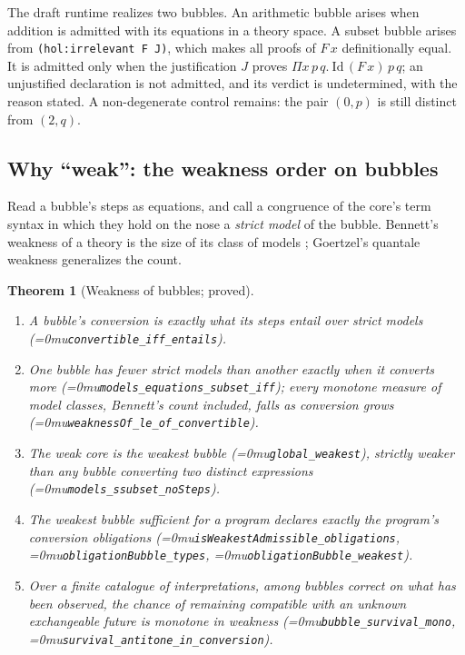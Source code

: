 \documentclass[11pt]{article}
\newcommand{\leanname}[1]{\textup{\Urlmuskip=0mu\relax\nolinkurl{#1}}}
\newtheorem{theorem}{Theorem}
\theoremstyle{definition}
\theoremstyle{remark}
\newcommand{\code}[1]{\texttt{#1}}
\begin{document}
The draft runtime realizes two bubbles. An arithmetic bubble arises when
addition is admitted with its equations in a theory space. A subset bubble
arises from \code{(hol:irrelevant F J)}, which makes all proofs of $F\,x$
definitionally equal. It is admitted only when the justification $J$ proves
$\Pi x\,p\,q.\ \mathrm{Id}\,(F\,x)\,p\,q$; an unjustified declaration is not
admitted, and its verdict is undetermined, with the reason stated. A non-degenerate control remains: the
pair $(0, p)$ is still distinct from $(2, q)$.

\subsection{Why ``weak'': the weakness order on bubbles}

Read a bubble's steps as equations, and call a congruence of the core's term
syntax in which they hold on the nose a \emph{strict model} of the bubble.
Bennett's weakness of a theory is the size of its class of models
\cite{BennettWeakestNotShortest}; Goertzel's quantale weakness generalizes the
count.

\begin{theorem}[Weakness of bubbles; proved]
\leavevmode
\begin{enumerate}[leftmargin=*]
\item A bubble's conversion is exactly what its steps entail over strict models
  (\leanname{convertible_iff_entails}).
\item One bubble has fewer strict models than another exactly when it converts
  more (\leanname{models_equations_subset_iff}); every monotone measure of
  model classes, Bennett's count included, falls as conversion grows
  (\leanname{weaknessOf_le_of_convertible}).
\item The weak core is the weakest bubble (\leanname{global_weakest}), strictly
  weaker than any bubble converting two distinct expressions
  (\leanname{models_ssubset_noSteps}).
\item The weakest bubble sufficient for a program declares exactly the
  program's conversion obligations (\leanname{isWeakestAdmissible_obligations},
  \leanname{obligationBubble_types}, \leanname{obligationBubble_weakest}).
\item Over a finite catalogue of interpretations, among bubbles correct on what
  has been observed, the chance of remaining compatible with an unknown
  exchangeable future is monotone in weakness
  (\leanname{bubble_survival_mono}, \leanname{survival_antitone_in_conversion}).
\end{enumerate}
\end{theorem}
\end{document}
